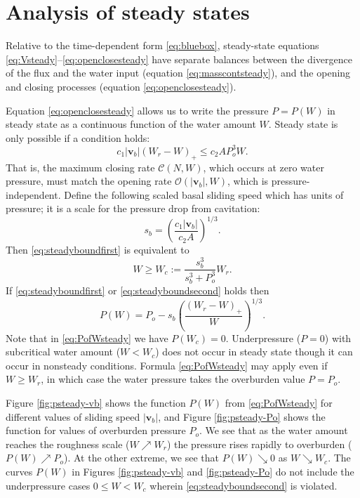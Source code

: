 \documentclass[gmd]{copernicus}   %
\newcommand\bv{\mathbf{v}}
\begin{document}
\appendix

\section{Analysis of steady states}  Relative to the time-dependent form \eqref{eq:bluebox}, steady-state equations \eqref{eq:Vsteady}--\eqref{eq:openclosesteady} have separate balances between the divergence of the flux and the water input (equation \eqref{eq:masscontsteady}), and the opening and closing processes (equation \eqref{eq:openclosesteady}).

Equation \eqref{eq:openclosesteady} allows us to write the pressure $P=P(W)$ in steady state as a continuous function of the water amount $W$.  Steady state is only possible if a condition holds:
\begin{equation}
c_1 |\bv_b| (W_r - W)_+ \le c_2 A P_o^3 W. \label{eq:steadyboundfirst}
\end{equation}
That is, the maximum closing rate $\mathcal{C}(N,W)$, which occurs at zero water pressure, must match the opening rate $\mathcal{O}(|\bv_b|,W)$, which is pressure-independent.  Define the following scaled basal sliding speed which has units of pressure; it is a scale for the pressure drop from cavitation:
\begin{equation}
s_b =  \left(\frac{c_1 |\bv_b|}{c_2 A}\right)^{1/3}.  \label{eq:definesb}
\end{equation}
Then \eqref{eq:steadyboundfirst} is equivalent to
\begin{equation}
W \ge W_c := \frac{s_b^3}{s_b^3 + P_o^3} W_r. \label{eq:steadyboundsecond}
\end{equation}
If \eqref{eq:steadyboundfirst} or \eqref{eq:steadyboundsecond} holds then
\begin{equation}
P(W) = P_o - s_b \left(\frac{(W_r - W)_+}{W}\right)^{1/3}.  \label{eq:PofWsteady}
\end{equation}
Note that in \eqref{eq:PofWsteady} we have $P(W_c)=0$.  Underpressure ($P=0$) with subcritical water amount ($W<W_c$) does not occur in steady state though it can occur in nonsteady conditions.  Formula \eqref{eq:PofWsteady} may apply even if $W\ge W_r$, in which case the water pressure takes the overburden value $P = P_o$.

\newcommand{\upto}{ \!\!\nearrow\! }
\newcommand{\downto}{ \!\searrow\! }
Figure \ref{fig:psteady-vb} shows the function $P(W)$ from \eqref{eq:PofWsteady} for different values of sliding speed $|\bv_b|$, and Figure \ref{fig:psteady-Po} shows the function for values of overburden pressure $P_o$.  We see that as the water amount reaches the roughness scale ($W\upto W_r$) the pressure rises rapidly to overburden ($P(W) \upto P_o$).  At the other extreme, we see that $P(W) \downto 0$ as $W \downto W_c$.  The curves $P(W)$ in Figures \ref{fig:psteady-vb} and \ref{fig:psteady-Po} do not include the underpressure cases $0\le W < W_c$ wherein \eqref{eq:steadyboundsecond} is violated.
\end{document}
